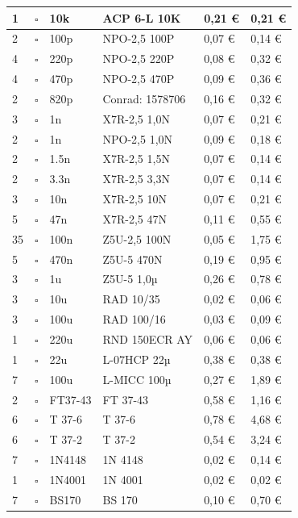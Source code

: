 \documentclass[10pt, a4paper,twoside]{scrartcl}
\begin{document}
\begin{longtable}{|p{}|p{}|p{}|p{}|p{}|p{}|}
1 & $\square$ & 10k & ACP 6-L 10K & 0,21 \euro & 0,21 \euro \\ \hline
2 & $\square$ & 100p & NPO-2,5 100P & 0,07 \euro & 0,14 \euro \\
4 & $\square$ & 220p & NPO-2,5 220P & 0,08 \euro & 0,32 \euro \\
4 & $\square$ & 470p & NPO-2,5 470P & 0,09 \euro & 0,36 \euro \\
2 & $\square$ & 820p & Conrad: 1578706 & 0,16 \euro & 0,32 \euro \\
3 & $\square$ & 1n & X7R-2,5 1,0N & 0,07 \euro & 0,21 \euro \\
2 & $\square$ & 1n & NPO-2,5 1,0N & 0,09 \euro & 0,18 \euro \\
2 & $\square$ & 1.5n & X7R-2,5 1,5N & 0,07 \euro & 0,14 \euro \\
2 & $\square$ & 3.3n & X7R-2,5 3,3N & 0,07 \euro & 0,14 \euro \\
3 & $\square$ & 10n & X7R-2,5 10N & 0,07 \euro & 0,21 \euro \\
5 & $\square$ & 47n & X7R-2,5 47N & 0,11 \euro & 0,55 \euro \\
35 & $\square$ & 100n & Z5U-2,5 100N & 0,05 \euro & 1,75 \euro \\
5 & $\square$ & 470n & Z5U-5 470N & 0,19 \euro & 0,95 \euro \\
3 & $\square$ & 1u & Z5U-5 1,0µ & 0,26 \euro & 0,78 \euro \\ \hline		
3 & $\square$ & 10u & RAD 10/35 & 0,02 \euro & 0,06 \euro \\
3 & $\square$ & 100u & RAD 100/16 & 0,03 \euro & 0,09 \euro \\
1 & $\square$ & 220u & RND 150ECR AY & 0,06 \euro & 0,06 \euro \\ \hline
1 & $\square$ & 22u & L-07HCP 22µ & 0,38 \euro & 0,38 \euro \\
7 & $\square$ & 100u & L-MICC 100µ & 0,27 \euro & 1,89 \euro \\ \hline
2 & $\square$ & FT37-43 & FT 37-43 & 0,58 \euro & 1,16 \euro \\
6 & $\square$ & T 37-6 & T 37-6 & 0,78 \euro & 4,68 \euro \\
6 & $\square$ & T 37-2 & T 37-2 & 0,54 \euro & 3,24 \euro \\ \hline
7 & $\square$ & 1N4148 & 1N 4148 & 0,02 \euro & 0,14 \euro \\
1 & $\square$ & 1N4001 & 1N 4001 & 0,02 \euro & 0,02 \euro \\
7 & $\square$ & BS170 & BS 170 & 0,10 \euro & 0,70 \euro \\

\end{longtable}
\end{document}
